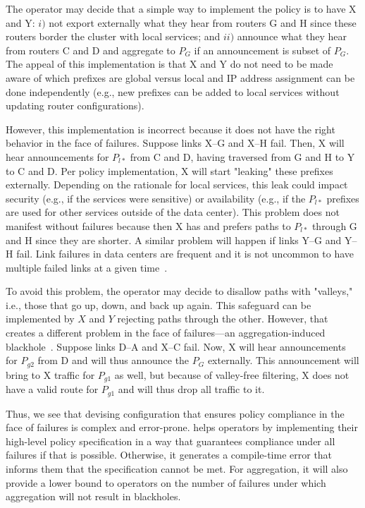 The operator may decide that a simple way to implement the policy is to have X and Y: $i)$ not export externally what they hear from routers G and H since these routers border the cluster with local services; and $ii)$ announce what they hear from routers C and D and aggregate to $P_G$ if an announcement is subset of $P_G$. The appeal of this implementation is that X and Y do not need to be made aware of which prefixes are global versus local and IP address assignment can be done independently (e.g., new prefixes can be added to local services without updating router configurations).

However, this implementation is incorrect because it does not have the right behavior in the face of failures. Suppose links X--G and X--H fail. Then, X will hear announcements for $P_{l*}$ from C and D, having traversed from G and H to Y to C and D. Per policy implementation, X will start "leaking" these prefixes externally. Depending on the rationale for local services, this leak could impact security (e.g., if the services were sensitive) or availability (e.g., if the $P_{l*}$ prefixes are used for other services outside of the data center). This problem does not manifest without failures because then X has and prefers paths to $P_{l*}$ through G and H since they are shorter. A similar problem will happen if links Y--G and Y--H fail.
Link failures in data centers are frequent and it is not uncommon to have multiple failed links at a given time~\cite{dc-failure-study}.

To avoid this problem, the operator may decide to disallow paths with "valleys," i.e., those that go up, down, and back up again. This safeguard can be implemented by $X$ and $Y$ rejecting paths through the other. However, that creates a different problem in the face of failures---an aggregation-induced blackhole~\cite{xx}. Suppose links D--A and X--C fail. Now, X will hear announcements for $P_{g2}$ from D and will thus announce the $P_G$ externally. This announcement will bring to X traffic for $P_{g1}$ as well, but because of valley-free filtering, X does not have a valid route for $P_{g1}$ and will thus drop all traffic to it.

Thus, we see that devising configuration that ensures policy compliance in the face of failures is complex and error-prone. \sysname helps operators by implementing their high-level policy specification in a way that guarantees compliance under all failures if that is possible. Otherwise, it generates a compile-time error that informs them that the specification cannot be met. For aggregation, it will also provide a lower bound to operators on the number of failures under which aggregation will not result in blackholes.



